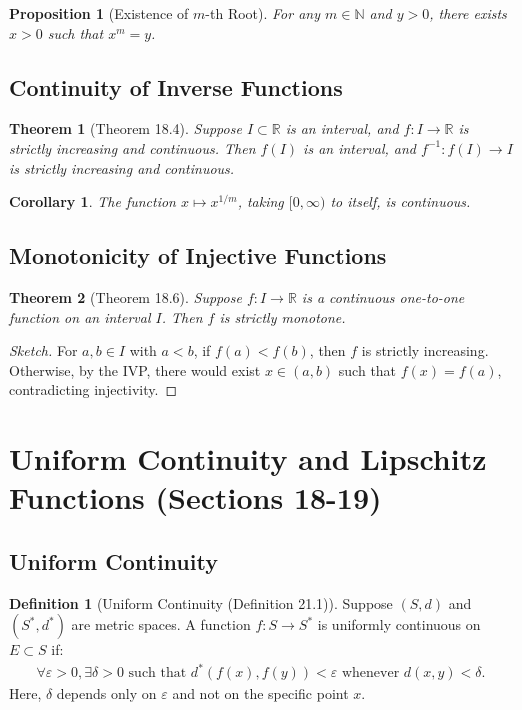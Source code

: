 \documentclass[9pt]{article}
\theoremstyle{definition}
\newtheorem{definition}{Definition}
\theoremstyle{plain}
\newtheorem{theorem}{Theorem}
\newtheorem{proposition}{Proposition}
\newtheorem{corollary}{Corollary}
\begin{document}
\begin{proposition}[Existence of $ m $-th Root]
For any $ m \in \mathbb{N} $ and $ y > 0 $, there exists $ x > 0 $ such that $ x^m = y $.
\end{proposition}

\subsection*{Continuity of Inverse Functions}
\begin{theorem}[Theorem 18.4]
Suppose $ I \subset \mathbb{R} $ is an interval, and $ f : I \to \mathbb{R} $ is strictly increasing and continuous. Then $ f(I) $ is an interval, and $ f^{-1} : f(I) \to I $ is strictly increasing and continuous.
\end{theorem}

\begin{corollary}
The function $ x \mapsto x^{1/m} $, taking $ [0, \infty) $ to itself, is continuous.
\end{corollary}

\subsection*{Monotonicity of Injective Functions}
\begin{theorem}[Theorem 18.6]
Suppose $ f : I \to \mathbb{R} $ is a continuous one-to-one function on an interval $ I $. Then $ f $ is strictly monotone.
\end{theorem}

\begin{proof}[Sketch]
For $ a, b \in I $ with $ a < b $, if $ f(a) < f(b) $, then $ f $ is strictly increasing. Otherwise, by the IVP, there would exist $ x \in (a, b) $ such that $ f(x) = f(a) $, contradicting injectivity.
\end{proof}
\section*{Uniform Continuity and Lipschitz Functions (Sections 18-19)}

\subsection*{Uniform Continuity}
\begin{definition}[Uniform Continuity (Definition 21.1)]
Suppose $ (S, d) $ and $ (S^*, d^*) $ are metric spaces. A function $ f : S \to S^* $ is uniformly continuous on $ E \subset S $ if:
\begin{align}
\forall \varepsilon > 0, \exists \delta > 0 \text{ such that } d^*(f(x), f(y)) < \varepsilon \text{ whenever } d(x, y) < \delta.
\end{align}
Here, $ \delta $ depends only on $ \varepsilon $ and not on the specific point $ x $.
\end{definition}
\end{document}
